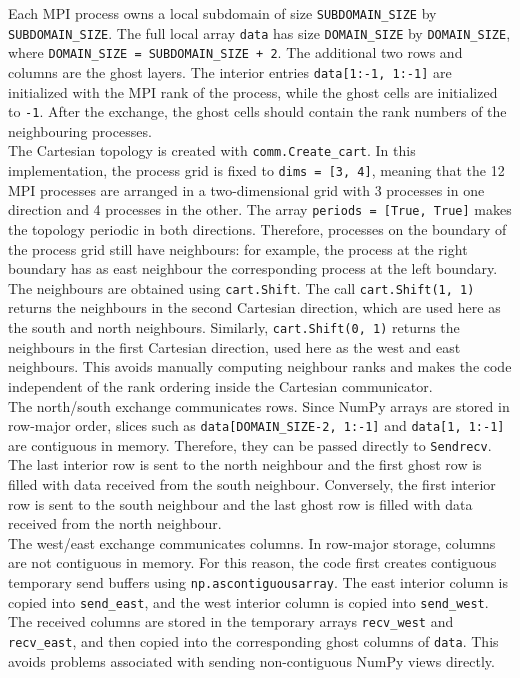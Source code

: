\documentclass[unicode,10pt,a4paper,oneside,numbers=endperiod,openany]{scrartcl}
\begin{document}
Each MPI process owns a local subdomain of size
\texttt{SUBDOMAIN\_SIZE} by \texttt{SUBDOMAIN\_SIZE}. The full local array \texttt{data} has size
\texttt{DOMAIN\_SIZE} by \texttt{DOMAIN\_SIZE}, where
\texttt{DOMAIN\_SIZE = SUBDOMAIN\_SIZE + 2}. The additional two rows and columns are the ghost
layers. The interior entries \texttt{data[1:-1, 1:-1]} are initialized with the MPI rank of the process,
while the ghost cells are initialized to \texttt{-1}. After the exchange, the ghost cells should contain
the rank numbers of the neighbouring processes.\\

The Cartesian topology is created with \texttt{comm.Create\_cart}. In this implementation, the process
grid is fixed to \texttt{dims = [3, 4]}, meaning that the 12 MPI processes are arranged in a
two-dimensional grid with 3 processes in one direction and 4 processes in the other. The array
\texttt{periods = [True, True]} makes the topology periodic in both directions. Therefore, processes
on the boundary of the process grid still have neighbours: for example, the process at the right
boundary has as east neighbour the corresponding process at the left boundary.\\
The neighbours are obtained using \texttt{cart.Shift}. The call
\texttt{cart.Shift(1, 1)} returns the neighbours in the second Cartesian direction, which are used here
as the south and north neighbours. Similarly, \texttt{cart.Shift(0, 1)} returns the neighbours in the
first Cartesian direction, used here as the west and east neighbours. This avoids manually computing
neighbour ranks and makes the code independent of the rank ordering inside the Cartesian communicator.\\

The north/south exchange communicates rows. Since NumPy arrays are stored in row-major order, slices
such as \texttt{data[DOMAIN\_SIZE-2, 1:-1]} and \texttt{data[1, 1:-1]} are contiguous in memory.
Therefore, they can be passed directly to \texttt{Sendrecv}. The last interior row is sent to the north
neighbour and the first ghost row is filled with data received from the south neighbour. Conversely, the
first interior row is sent to the south neighbour and the last ghost row is filled with data received from
the north neighbour.\\
The west/east exchange communicates columns. In row-major storage, columns are not contiguous in
memory. For this reason, the code first creates contiguous temporary send buffers using
\texttt{np.ascontiguousarray}. The east interior column is copied into \texttt{send\_east}, and the west
interior column is copied into \texttt{send\_west}. The received columns are stored in the temporary
arrays \texttt{recv\_west} and \texttt{recv\_east}, and then copied into the corresponding ghost columns
of \texttt{data}. This avoids problems associated with sending non-contiguous NumPy views directly.
\end{document}
